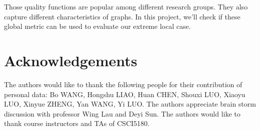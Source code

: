 \documentclass[11pt,a4paper]{article}
\begin{document}
	Those quality functions are popular among different research 
	groups. They also capture different characteristics of graphs. 
	In this project, we'll check if these global metric can 
	be used to evaluate our extreme local case. 

\section*{Acknowledgements}

The authors would like to thank the following people for their contribution of 
personal data: 
Bo WANG, Hongshu LIAO, Huan CHEN, Shouxi LUO, 
Xiaoyu LUO, Xinyue ZHENG, Yan WANG, Yi LUO. 
The authors appreciate brain storm discussion with professor Wing Lau 
and Deyi Sun. 
The authors would like to thank course instructors and TAs of CSCI5180. 



%
%
%

\end{document}
